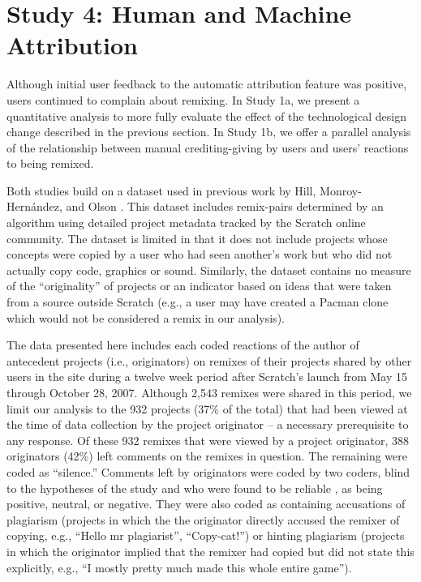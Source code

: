 \section{Study 4: Human and Machine Attribution}

Although initial user feedback to the automatic attribution feature
was positive, users continued to complain about remixing.  In Study
1a, we present a quantitative analysis to more fully evaluate the
effect of the technological design change described in the previous
section.  In Study 1b, we offer a parallel analysis of the
relationship between manual crediting-giving by users and users'
reactions to being remixed.

Both studies build on a dataset used in previous work by Hill,
Monroy-Hernández, and Olson \cite{hill_responses_2010}. This dataset
includes remix-pairs determined by an algorithm using detailed project
metadata tracked by the Scratch online community.  The dataset is
limited in that it does not include projects whose concepts were
copied by a user who had seen another’s work but who did not actually
copy code, graphics or sound. Similarly, the dataset contains no
measure of the ``originality'' of projects or an indicator based on
ideas that were taken from a source outside Scratch (e.g., a user may
have created a Pacman clone which would not be considered a remix in
our analysis).

The data presented here includes each coded reactions of the author of
antecedent projects (i.e., originators) on remixes of their projects
shared by other users in the site during a twelve week period after
Scratch's launch from May 15 through October 28, 2007. Although 2,543
remixes were shared in this period, we limit our analysis to the 932
projects (37\% of the total) that had been viewed at the time of data
collection by the project originator -- a necessary prerequisite to
any response. Of these 932 remixes that were viewed by a project
originator, 388 originators (42\%) left comments on the remixes in
question. The remaining were coded as ``silence.''  Comments left by
originators were coded by two coders, blind to the hypotheses of the
study and who were found to be reliable \cite{hill_responses_2010}, as
being positive, neutral, or negative. They were also coded as 
containing accusations of plagiarism (projects in which the the
originator directly accused the remixer of copying, e.g., ``Hello mr
plagiarist'', ``Copy-cat!'')  or hinting plagiarism (projects in which
the originator implied that the remixer had copied but did not state
this explicitly, e.g., ``I mostly pretty much made this whole entire
game'').

